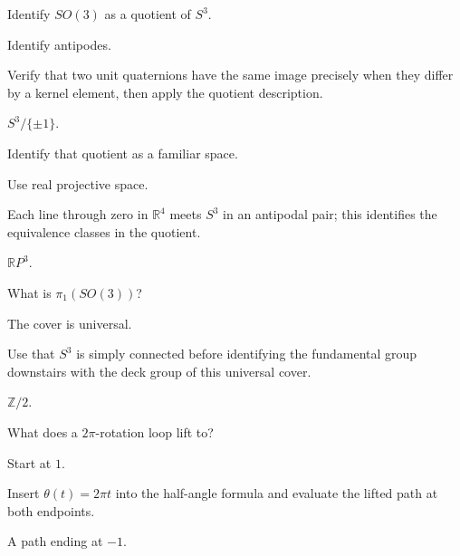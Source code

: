 \begin{exercise}\label{exr:viii13-14}
Identify \(SO(3)\) as a quotient of \(S^3\).
\end{exercise}
\begin{hint}
Identify antipodes.

Verify that two unit quaternions have the same image precisely when they differ by a kernel element, then apply the quotient description.
\end{hint}
\begin{solution}
\(S^3/\{\pm1\}\).
\end{solution}

\begin{exercise}\label{exr:viii13-15}
Identify that quotient as a familiar space.
\end{exercise}
\begin{hint}
Use real projective space.

Each line through zero in \(\mathbb R^4\) meets \(S^3\) in an antipodal pair; this identifies the equivalence classes in the quotient.
\end{hint}
\begin{solution}
\(\mathbb RP^3\).
\end{solution}

\begin{exercise}\label{exr:viii13-16}
What is \(\pi_1(SO(3))\)?
\end{exercise}
\begin{hint}
The cover is universal.

Use that \(S^3\) is simply connected before identifying the fundamental group downstairs with the deck group of this universal cover.
\end{hint}
\begin{solution}
\(\mathbb Z/2\).
\end{solution}

\begin{exercise}\label{exr:viii13-17}
What does a \(2\pi\)-rotation loop lift to?
\end{exercise}
\begin{hint}
Start at \(1\).

Insert \(\theta(t)=2\pi t\) into the half-angle formula and evaluate the lifted path at both endpoints.
\end{hint}
\begin{solution}
A path ending at \(-1\).
\end{solution}

